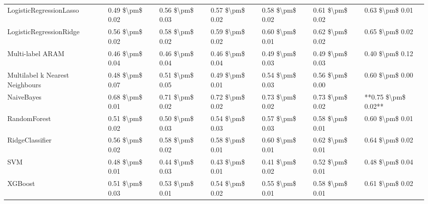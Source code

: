 \begin{tabular}{lllllll}
LogisticRegressionLasso         &  0.49 \$\textbackslash pm\$ 0.02 &           0.56 \$\textbackslash pm\$ 0.03 &       0.57 \$\textbackslash pm\$ 0.02 &        0.58 \$\textbackslash pm\$ 0.02 &                         0.61 \$\textbackslash pm\$ 0.02 &      0.63 \$\textbackslash pm\$ 0.01 \\
LogisticRegressionRidge         &  0.56 \$\textbackslash pm\$ 0.02 &           0.58 \$\textbackslash pm\$ 0.02 &       0.59 \$\textbackslash pm\$ 0.02 &        0.60 \$\textbackslash pm\$ 0.01 &                         0.62 \$\textbackslash pm\$ 0.02 &      0.65 \$\textbackslash pm\$ 0.02 \\
Multi-label ARAM                &  0.46 \$\textbackslash pm\$ 0.04 &           0.46 \$\textbackslash pm\$ 0.04 &       0.46 \$\textbackslash pm\$ 0.04 &        0.49 \$\textbackslash pm\$ 0.03 &                         0.49 \$\textbackslash pm\$ 0.03 &      0.40 \$\textbackslash pm\$ 0.12 \\
Multilabel k Nearest Neighbours &  0.48 \$\textbackslash pm\$ 0.07 &           0.51 \$\textbackslash pm\$ 0.05 &       0.49 \$\textbackslash pm\$ 0.01 &        0.54 \$\textbackslash pm\$ 0.03 &                         0.56 \$\textbackslash pm\$ 0.00 &      0.60 \$\textbackslash pm\$ 0.00 \\
NaiveBayes                      &  0.68 \$\textbackslash pm\$ 0.01 &           0.71 \$\textbackslash pm\$ 0.02 &       0.72 \$\textbackslash pm\$ 0.02 &        0.73 \$\textbackslash pm\$ 0.02 &                         0.73 \$\textbackslash pm\$ 0.02 &  **0.75 \$\textbackslash pm\$ 0.02** \\
RandomForest                    &  0.51 \$\textbackslash pm\$ 0.02 &           0.50 \$\textbackslash pm\$ 0.03 &       0.54 \$\textbackslash pm\$ 0.03 &        0.57 \$\textbackslash pm\$ 0.03 &                         0.58 \$\textbackslash pm\$ 0.01 &      0.60 \$\textbackslash pm\$ 0.01 \\
RidgeClassifier                 &  0.56 \$\textbackslash pm\$ 0.02 &           0.58 \$\textbackslash pm\$ 0.02 &       0.58 \$\textbackslash pm\$ 0.01 &        0.60 \$\textbackslash pm\$ 0.01 &                         0.62 \$\textbackslash pm\$ 0.01 &      0.64 \$\textbackslash pm\$ 0.02 \\
SVM                             &  0.48 \$\textbackslash pm\$ 0.01 &           0.44 \$\textbackslash pm\$ 0.03 &       0.43 \$\textbackslash pm\$ 0.01 &        0.41 \$\textbackslash pm\$ 0.02 &                         0.52 \$\textbackslash pm\$ 0.01 &      0.48 \$\textbackslash pm\$ 0.04 \\
XGBoost                         &  0.51 \$\textbackslash pm\$ 0.03 &           0.53 \$\textbackslash pm\$ 0.01 &       0.54 \$\textbackslash pm\$ 0.02 &        0.55 \$\textbackslash pm\$ 0.01 &                         0.58 \$\textbackslash pm\$ 0.01 &      0.61 \$\textbackslash pm\$ 0.02 \\
\bottomrule
\end{tabular}
